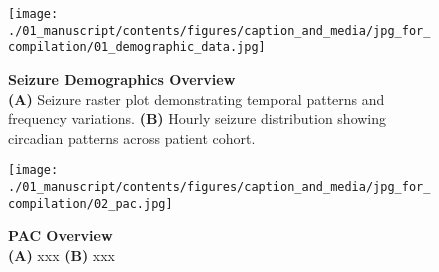 
\begin{figure*}[p]
    \centering
    \texttt{[image: ./01\_manuscript/contents/figures/caption\_and\_media/jpg\_for\_compilation/01\_demographic\_data.jpg]}
    \caption{\textbf{
Seizure Demographics Overview
}
\smallskip
\\
\textbf{(A)} Seizure raster plot demonstrating temporal patterns and frequency variations.
\textbf{(B)} Hourly seizure distribution showing circadian patterns across patient cohort.
}
    \label{fig:1_demographic_data}
\end{figure*}

\clearpage
\begin{figure*}[p]
    \centering
    \texttt{[image: ./01\_manuscript/contents/figures/caption\_and\_media/jpg\_for\_compilation/02\_pac.jpg]}
    \caption{\textbf{
PAC Overview
}
\smallskip
\\
\textbf{(A)} xxx
\textbf{(B)} xxx
}
    \label{fig:2_pac}
\end{figure*}

